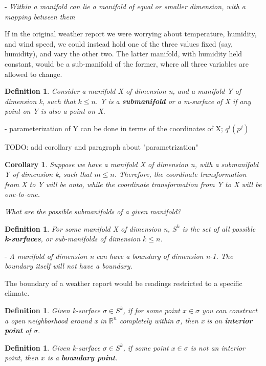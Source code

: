 \documentclass{book}
\newtheorem{defn}[equation]{Definition}
\newtheorem{coro}[equation]{Corollary}
\begin{document}
- \emph{Within a manifold can lie a manifold of equal or smaller dimension, with a mapping between them}

If in the original weather report we were worrying about temperature, humidity, and wind speed, we could instead hold one of the three values fixed (say, humidity), and vary the other two. The latter manifold, with humidity held constant, would be a sub-manifold of the former, where all three variables are allowed to change.  



\begin{defn}
	Consider a manifold X of dimension n, and a manifold Y of dimension k, such that $k \leq n$. Y is a \textbf{submanifold} or a m-surface of X if any point on Y is also a point on X. 
\end{defn}

- parameterization of Y can be done in terms of the coordinates of X; $q^i(p^j)$

TODO: add corollary and paragraph about "parametrization"

\begin{coro}
	Suppose we have a manifold X of dimension n, with a submanifold Y of dimension k, such that $m \leq n$. Therefore, the coordinate transformation from X to Y will be onto, while the coordinate transformation from Y to X will be one-to-one. 
\end{coro}



\emph{What are the possible submanifolds of a given manifold?}


\begin{defn}
	For some manifold X of dimension n, $S^k$ is the set of all possible \textbf{k-surfaces}, or sub-manifolds of dimension $k \leq n$. 
\end{defn}

- \emph{A manifold of dimension n can have a boundary of dimension n-1. The boundary itself will not have a boundary.}

The boundary of a weather report would be readings restricted to a specific climate. 


\begin{defn}
	Given k-surface $\sigma \in S^k$, if for some point $x \in \sigma$ you can construct a open neighborhood around x in $\mathbb{R}^n$ completely within $\sigma$, then x is an \textbf{interior point} of $\sigma$. 
\end{defn}

\begin{defn}
	Given k-surface $\sigma \in S^k$, if some point $x \in \sigma$ is not an interior point, then $x$ is a \textbf{boundary point}.
\end{defn}
\end{document}
